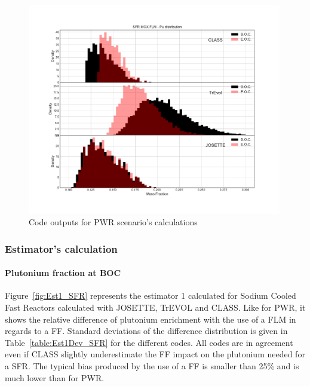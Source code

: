 \begin{figure}[h]
	\begin{center}
		\includegraphics[width = 0.99\textwidth]{../../Feature_1/RAW_DATA/FIG/SFR_MOX_FLM_Pu.pdf}
		\caption{Code outputs for PWR scenario's calculations}
		\label{fig:SFR_MOX_FLM_Pu}
	\end{center}
\end{figure}

\subsubsection{Estimator's calculation}
\paragraph{Plutonium fraction at BOC}

Figure~\ref{fig:Est1_SFR} represents the estimator 1 calculated for Sodium
Cooled Fast Reactors calculated with JOSETTE, TrEVOL and CLASS. Like for PWR, it
shows the relative difference of plutonium enrichment with the use of a FLM in
regards to a FF. Standard deviations of the difference distribution is given in
Table~\ref{table:Est1Dev_SFR} for the different codes. All codes are in
agreement even if CLASS slightly underestimate the FF impact on the plutonium
needed for a SFR. The typical bias produced by the use of a FF is smaller than
25\% and is much lower than for PWR.   

